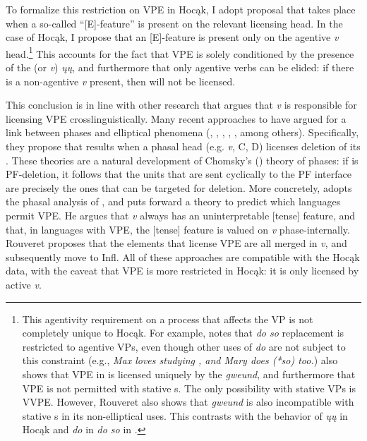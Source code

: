 \documentclass[output=paper]{LSP/langsci}
\begin{document}
 
To formalize this restriction on VPE in Hocąk, I adopt  proposal that  takes place when a so-called ``[E]-feature'' is present on the relevant licensing head. In the case of Hocąk, I propose that an [E]-feature is present only on the agentive \emph{v} head.\footnote{This agentivity requirement on a process that affects the VP is not completely unique to Hocąk. For example, \citet{Hallman2004} notes that  \emph{do so} replacement is restricted to agentive VPs, even though other uses of \emph{do} are not subject to this constraint (e.g., \emph{Max loves studying , and Mary does (*so) too.}) \citet{Rouveret2012} also shows that VPE in  is licensed uniquely by the  \emph{gweund}, and furthermore that VPE is not permitted with stative s. The only possibility with stative VPs is VVPE. However, Rouveret also shows that \emph{gweund} is also incompatible with stative s in its non-elliptical uses. This contrasts with the behavior of \emph{ųų} in Hocąk and \emph{do} in \emph{do so} in .}  This accounts for the fact that VPE is solely conditioned by the presence of the  (or \emph{v}) \emph{ųų}, and furthermore that only agentive verbs can be elided: if there is a non-agentive \emph{v} present, then  will not be licensed. 

This conclusion is in line with other research that argues that \emph{v} is responsible for licensing VPE crosslinguistically. Many recent approaches to  have argued for a link between phases and elliptical phenomena (\citealt{Holmberg2001}, \citealt{vanCraenenbroeck2004}, \citealt{Gengel2007},  \citealt{YoshidaGallego2008}, \citealt{Gallego2009}, among others). Specifically, they propose that  results when a phasal head (e.g. \emph{v}, C, D) licenses deletion of its . These theories are a natural development of Chomsky's (\citeyear{Chomsky2000,Chomsky2001b,Chomsky2004}) theory of phases: if  is PF-deletion, it follows that the units that are sent cyclically to the PF interface are precisely the ones that can be targeted for deletion. More concretely, \citet{Rouveret2012} adopts the phasal analysis of , and puts forward a theory to predict which languages permit VPE. He argues that \emph{v} always has an uninterpretable [tense] feature, and that, in languages with VPE, the [tense] feature is valued on \emph{v} phase-internally. Rouveret proposes that the elements that license VPE are all merged in \emph{v}, and subsequently move to Infl. All of these approaches are compatible with the Hocąk data, with the caveat that VPE is more restricted in Hocąk: it is only licensed by active \emph{v}.
 
\end{document}

